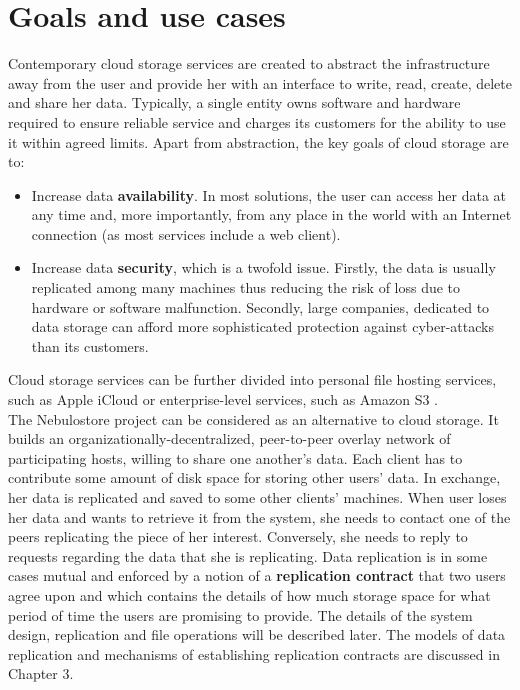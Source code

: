 \documentclass{pracamgren}
\begin{document}
\section{Goals and use cases}

Contemporary cloud storage services are created to abstract the infrastructure away from the user and provide her with an interface to write, read, create, delete and share her data. Typically, a single entity owns software and hardware required to ensure reliable service and charges its customers for the ability to use it within agreed limits. Apart from abstraction, the key goals of cloud storage are to:
\begin{itemize}
\item Increase data {\bf availability}. In most solutions, the user can access her data at any time and, more importantly, from any place in the world with an Internet connection (as most services include a web client).
\item Increase data {\bf security}, which is a twofold issue. Firstly, the data is usually replicated among many machines thus reducing the risk of loss due to hardware or software malfunction. Secondly, large companies, dedicated to data storage can afford more sophisticated protection against cyber-attacks than its customers.
\end{itemize}
Cloud storage services can be further divided into personal file hosting services, such as Apple iCloud \cite{icloud} or enterprise-level services, such as Amazon S3 \cite{amazon}.\\

The Nebulostore project can be considered as an alternative to cloud storage. It builds an organizationally-decentralized, peer-to-peer overlay network of participating hosts, willing to share one another's data. Each client has to contribute some amount of disk space for storing other users' data. In exchange, her data is replicated and saved to some other clients' machines. When user loses her data and wants to retrieve it from the system, she needs to contact one of the peers replicating the piece of her interest. Conversely, she needs to reply to requests regarding the data that she is replicating. Data replication is in some cases mutual and enforced by a notion of a {\bf replication contract} that two users agree upon and which contains the details of how much storage space for what period of time the users are promising to provide. The details of the system design, replication and file operations will be described later. The models of data replication and mechanisms of establishing replication contracts are discussed in Chapter 3.\\
\end{document}
